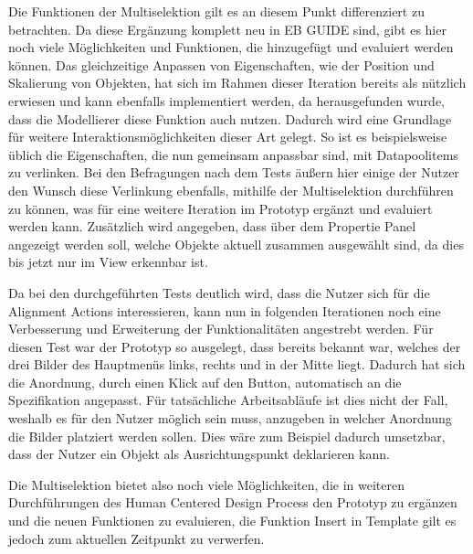 Die Funktionen der Multiselektion gilt es an diesem Punkt differenziert zu betrachten.
Da diese Ergänzung komplett neu in EB GUIDE sind, gibt es hier noch viele Möglichkeiten und Funktionen, die hinzugefügt und evaluiert werden können.
Das gleichzeitige Anpassen von Eigenschaften, wie der Position und Skalierung von Objekten, hat sich im Rahmen dieser Iteration bereits als nützlich erwiesen und kann ebenfalls implementiert werden, da herausgefunden wurde, dass die Modellierer diese Funktion auch nutzen.
Dadurch wird eine Grundlage für weitere Interaktionsmöglichkeiten dieser Art gelegt.
So ist es beispielsweise üblich die Eigenschaften, die nun gemeinsam anpassbar sind, mit Datapoolitems zu verlinken.
Bei den Befragungen nach dem Tests äußern hier einige der Nutzer den Wunsch diese Verlinkung ebenfalls, mithilfe der Multiselektion durchführen zu können, was für eine weitere Iteration im Prototyp ergänzt und evaluiert werden kann.
Zusätzlich wird angegeben, dass über dem Propertie Panel angezeigt werden soll, welche Objekte aktuell zusammen ausgewählt sind, da dies bis jetzt nur im View erkennbar ist.

Da bei den durchgeführten Tests deutlich wird, dass die Nutzer sich für die Alignment Actions interessieren, kann nun in folgenden Iterationen noch eine Verbesserung und Erweiterung der Funktionalitäten angestrebt werden.
Für diesen Test war der Prototyp so ausgelegt, dass bereits bekannt war, welches der drei Bilder des Hauptmenüs links, rechts und in der Mitte liegt.
Dadurch hat sich die Anordnung, durch einen Klick auf den Button, automatisch an die Spezifikation angepasst.
Für tatsächliche Arbeitsabläufe ist dies nicht der Fall, weshalb es für den Nutzer möglich sein muss, anzugeben in welcher Anordnung die Bilder platziert werden sollen.
Dies wäre zum Beispiel dadurch umsetzbar, dass der Nutzer ein Objekt als Ausrichtungspunkt deklarieren kann.

Die Multiselektion bietet also noch viele Möglichkeiten, die in weiteren Durchführungen des Human Centered Design Process den Prototyp zu ergänzen und die neuen Funktionen zu evaluieren, die Funktion \glqq Insert in Template\grqq{} gilt es jedoch zum aktuellen Zeitpunkt zu verwerfen.